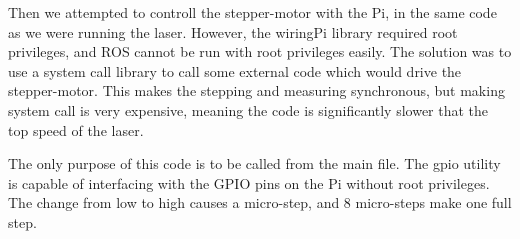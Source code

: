 Then we attempted to controll the stepper-motor with the Pi, in the same code as we were running the laser. However, the wiringPi library required root privileges, and ROS cannot be run with root privileges easily. The solution was to use a system call library to call some external code which would drive the stepper-motor. This makes the stepping and measuring synchronous, but making system call is very expensive, meaning the code is significantly slower that the top speed of the laser.




The only purpose of this code is to be called from the main file. The gpio utility is capable of interfacing with the GPIO pins on the Pi without root privileges. The change from low to high causes a micro-step, and 8 micro-steps make one full step.

